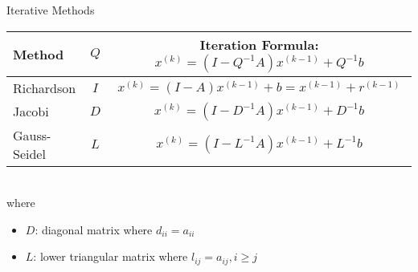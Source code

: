 \documentclass[9pt, serif]{beamer}
\newlength{\wideitemsep}
\let\olditem\item
\renewcommand{\item}{\setlength{\itemsep}{\wideitemsep}\olditem}
\newcommand{\bi}{\begin{itemize}}
\newcommand{\ei}{\end{itemize}}
\begin{document}
\begin{frame}{Iterative Methods}
    \pause
    \begin{centering}
        \begin{tabular}{l|c|c}
            Method & $Q$ & Iteration Formula: $x^{(k)} = (I-Q^{-1}A)x^{(k-1)}+Q^{-1}b$ \\ \hline \hline
            Richardson & $I$ & $x^{(k)} = (I-A)x^{(k-1)}+b = x^{(k-1)}+r^{(k-1)}$ \\
            Jacobi & $D$ & $x^{(k)} = (I-D^{-1}A)x^{(k-1)}+D^{-1}b$ \\
            Gauss-Seidel & $L$ & $x^{(k)} = (I-L^{-1}A)x^{(k-1)}+L^{-1}b$
        \end{tabular}
    \end{centering}
    \\[5mm]
    where
    \bi
        \item $D$: diagonal matrix where $d_{ii} = a_{ii}$
        \item $L$: lower triangular matrix where $l_{ij} = a_{ij}, i \ge j$
    \ei
\end{frame}
\end{document}
